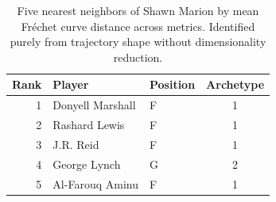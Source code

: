 \begin{table}[htbp]
  \centering\small
  \begin{tabular}{rllc}
    \toprule
    Rank & Player & Position & Archetype \\
    \midrule
    1 & Donyell Marshall & F & 1 \\
    2 & Rashard Lewis & F & 1 \\
    3 & J.R. Reid & F & 1 \\
    4 & George Lynch & G & 2 \\
    5 & Al-Farouq Aminu & F & 1 \\
    \bottomrule
  \end{tabular}
  \caption{Five nearest neighbors of Shawn Marion by mean Fr\'{e}chet curve distance across metrics. Identified purely from trajectory shape without dimensionality reduction.}
  \label{tab:Shawn_Marion_frechet_curve_neighbors}
\end{table}

